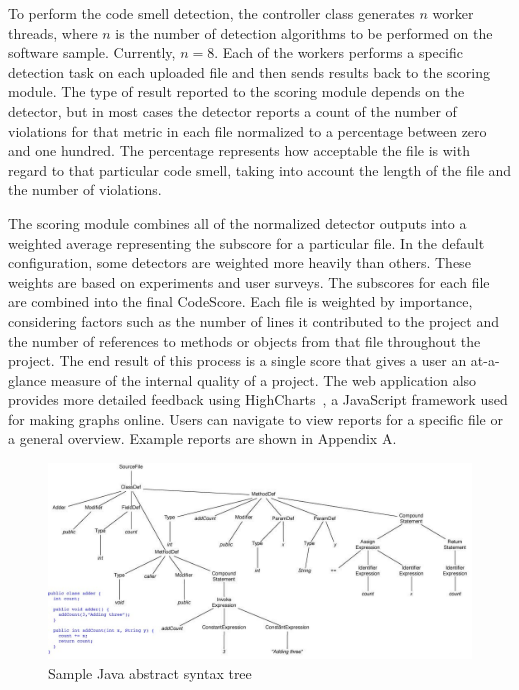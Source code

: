 \documentclass{sig-alternate}
\begin{document}
To perform the code smell detection, the controller class
generates $n$ worker threads, where $n$ is the number of detection algorithms to be
performed on the software sample. Currently, $n=8$. Each of the workers performs a specific detection task on
each uploaded file and then sends results back to the scoring module. The
type of result reported to the scoring module depends on the detector, but in
most cases the detector reports a count of the number of violations for that
metric in each file normalized to a percentage between zero and one hundred. The
percentage represents how acceptable the file is with regard to that particular
code smell, taking into account the length of the file and the number of
violations. 

The scoring module combines all of the normalized detector outputs into a
weighted average representing the subscore for a particular file. In the default
configuration, some detectors
are weighted more heavily than others. These weights are based on experiments
and user surveys. The subscores for each file are combined into the final
CodeScore. Each file is weighted by importance, considering factors such as the
number of lines it contributed to the project and the number of references to methods or
objects from that file throughout the project. The end result of this 
process is a single score that gives a user an at-a-glance measure of the internal quality of a project.
The web application also provides more detailed feedback using
HighCharts~\cite{highcharts}, a
JavaScript framework used for making graphs online. Users can navigate to view
reports for a specific file or a general overview. Example reports are shown in
Appendix A.

\begin{figure}[ht]
	\begin{center}
		\includegraphics[width=0.9\linewidth]{syntax_tree}
	\end{center}
	\vspace{-12pt}
	\caption{Sample Java abstract syntax tree}
	\label{fig: ast}
\end{figure}
\end{document}
